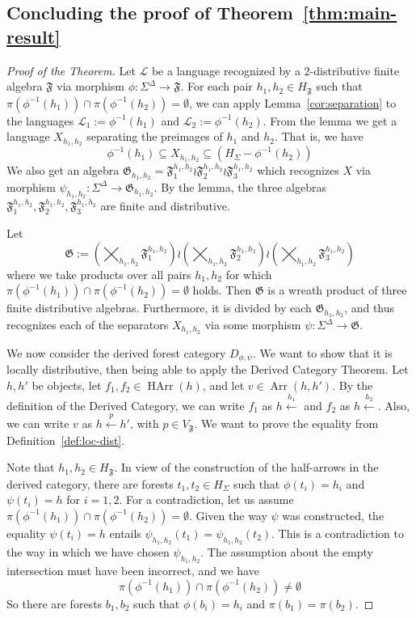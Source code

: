 \documentclass[sigplan,9pt]{acmart}\settopmatter{printfolios=true,printccs=false,printacmref=false}
\newcounter{thm}
\theoremstyle{definition}
\newcommand{\La}[0]{{\mathcal{L}}}
\newcommand{\Ff}[0]{{\mathfrak{F}}}
\newcommand{\Gg}[0]{{\mathfrak{G}}}
\newcommand{\carrow}[3]{#3 \xleftarrow{#2} #1 }
\newcommand{\HArr}[0]{{\operatorname{HArr}}}
\newcommand{\Arr}[0]{{\operatorname{Arr}}}
\begin{document}
\subsection{Concluding the proof of Theorem~\ref{thm:main-result}}\label{rect:result-proof}



\begin{proof}[Proof of the Theorem]
Let $\La$ be a language recognized by a 2-distributive finite algebra $\Ff$ via morphism $\phi : \Sigma^\Delta \rightarrow \Ff$.
For each pair $h_1, h_2 \in H_\Ff$ such that $\pi(\phi^{-1}(h_1)) \cap \pi(\phi^{-1}(h_2)) = \emptyset$, we can apply Lemma~\ref{cor:separation} to the languages $\La_1 := \phi^{-1}(h_1)$ and $\La_2 := \phi^{-1}(h_2)$.
From the lemma we get a language $X_{h_1,h_2}$ separating the preimages of $h_1$ and $h_2$.
That is, we have
$$\phi^{-1}(h_1) \subseteq X_{h_1,h_2} \subseteq (H_\Sigma - \phi^{-1}(h_2))$$
We also get an algebra $\Gg_{h_1, h_2} = \Ff_1^{h_1,h_2} \wr \Ff_2^{h_1,h_2} \wr \Ff_3^{h_1,h_2}$ which recognizes $X$ via morphism $\psi_{h_1, h_2} : \Sigma^\Delta \rightarrow \Gg_{h_1, h_2}$.
By the lemma, the three algebras $\Ff_1^{h_1,h_2}, \Ff_2^{h_1,h_2}, \Ff_3^{h_1,h_2}$ are finite and distributive.



Let $$\Gg := \left(\bigtimes_{h_1, h_2} \Ff_1^{h_1, h_2}\right) \wr \left(\bigtimes_{h_1, h_2} \Ff_2^{h_1, h_2}\right) \wr \left(\bigtimes_{h_1, h_2} \Ff_3^{h_1, h_2}\right)$$
where we take products over all pairs $h_1, h_2$ for which $\pi(\phi^{-1}(h_1)) \cap \pi(\phi^{-1}(h_2)) = \emptyset$ holds.
Then $\Gg$ is a wreath product of three finite distributive algebras.
Furthermore, it is divided by each $\Gg_{h_1, h_2}$, and thus recognizes each of the separators $X_{h_1, h_2}$ via some morphism $\psi : \Sigma^\Delta \rightarrow \Gg$.


We now consider the derived forest category $D_{\phi,\psi}$.
We want to show that it is locally distributive, then being able to apply the Derived Category Theorem.
Let $h, h'$ be objects, let $f_1, f_2 \in \HArr(h)$, and let $v \in \Arr(h,h')$.
By the definition of the Derived Category, we can write $f_1$ as $\carrow{}{h_1}h$ and $f_2$ as $\carrow{}{h_2}h$.
Also, we can write $v$ as $\carrow{h}{p} h'$, with $p \in V_\Ff$.
We want to prove the equality from Definition~\ref{def:loc-dist}.


Note that $h_1, h_2 \in H_\Ff$.
In view of the construction of the half-arrows in the derived category, there are forests $t_1, t_2 \in H_\Sigma$ such that $\phi(t_i) = h_i$ and $\psi(t_i) = h$ for $i=1,2$.
For a contradiction, let us assume $\pi(\phi^{-1}(h_1)) \cap \pi(\phi^{-1}(h_2)) = \emptyset$.
Given the way $\psi$ was constructed, the equality $\psi(t_i) = h$ entails $\psi_{h_1, h_2}(t_1) =\psi_{h_1, h_2}(t_2)$.
This is a contradiction to the way in which we have chosen $\psi_{h_1,h_2}$.
The assumption about the empty intersection must have been incorrect, and we have
$$\pi(\phi^{-1}(h_1)) \cap \pi(\phi^{-1}(h_2)) \neq \emptyset$$
So there are forests $b_1, b_2$ such that $\phi(b_i) = h_i$ and $\pi(b_1) = \pi(b_2)$.


\end{proof}
\end{document}
